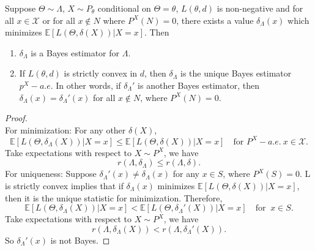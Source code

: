 \documentclass[a4paper]{article}
\begin{document}
\begin{thm}
	Suppose $\Theta \sim \Lambda$, $X \sim P_\theta$ conditional on $\Theta=\theta$, $L(\theta,d)$ is non-negative and for all $x \in \mathcal{X}$ or for all $x \notin N$ where $P^{X}(N)=0$, there exists a value $\delta_{\Lambda}(x)$ which minimizes $\mathbb{E}[L(\Theta,\delta(X))|X=x]$. Then
	\begin{enumerate}
		\item $\delta_{\Lambda}$ is a Bayes estimator for $\Lambda$.
		\item If $L(\theta,d)$ is strictly convex in $d$, then $\delta_{\Lambda}$ is the unique Bayes estimator $p^{X} - a.e.$ In other words, if $\delta_{\Lambda}'$ is another Bayes estimator, then $\delta_{\Lambda}(x)=\delta_{\Lambda}'(x)$ for all $x \notin N$, where $P^{X}(N)=0$.
	\end{enumerate}
\end{thm}

\begin{proof}
	\quad \\
	For minimization: For any other $\delta(X)$,
	\begin{equation}
		\mathbb{E}[L(\Theta,\delta_{\Lambda}(X))|X=x] \leq \mathbb{E}[L(\Theta,\delta(X))|X=x] \quad \text{for } P^X - a.e. \ x \in \mathcal{X}.
	\end{equation}
	Take expectations with respect to $X \sim P^X$, we have
	\begin{equation}
		r(\Lambda,\delta_{\Lambda}) \leq r(\Lambda,\delta).
	\end{equation}
	For uniqueness: Suppose $\delta_{\Lambda}'(x) \neq \delta_{\Lambda}(x)$ for any $x \in S$, where $P^X(S)=0$. L is strictly convex implies that if $\delta_{\Lambda}(x)$ minimizes $\mathbb{E}[L(\Theta,\delta(X))|X=x]$, then it is the unique statistic for minimization. Therefore,
	\begin{equation}
		\mathbb{E}[L(\Theta,\delta_{\Lambda}(X))|X=x] < \mathbb{E}[L(\Theta,\delta_{\Lambda}'(X))|X=x] \quad \text{for } \ x \in S.
	\end{equation}
	Take expectations with respect to $X \sim P^X$, we have
	\begin{equation}
		r(\Lambda,\delta_{\Lambda}(X)) < r(\Lambda,\delta_{\Lambda}'(X)).
	\end{equation}
	So $\delta_{\Lambda}'(x)$ is not Bayes.
\end{proof}
\end{document}
